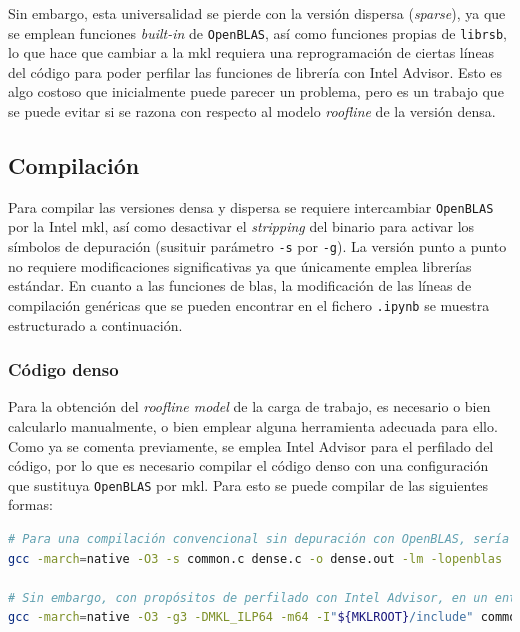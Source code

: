 Sin embargo, esta universalidad se pierde con la versión dispersa (\textit{sparse}), ya que se emplean funciones \textit{built-in} de \texttt{OpenBLAS}, así como funciones propias de \texttt{librsb}, lo que hace que cambiar a la \acrshort{mkl} requiera una reprogramación de ciertas líneas del código para poder perfilar las funciones de librería con Intel Advisor. Esto es algo costoso que inicialmente puede parecer un problema, pero es un trabajo que se puede evitar si se razona con respecto al modelo \textit{roofline} de la versión densa.

\subsection{Compilación}
\label{ssec:compilacion_metodologia}
Para compilar las versiones densa y dispersa se requiere intercambiar \texttt{OpenBLAS} por la Intel \acrshort{mkl}, así como desactivar el \textit{stripping} del binario para activar los símbolos de depuración (susituir parámetro \texttt{-s} por \texttt{-g}). La versión punto a punto no requiere modificaciones significativas ya que únicamente emplea librerías estándar. En cuanto a las funciones de \acrshort{blas}, la modificación de las líneas de compilación genéricas que se pueden encontrar en el fichero \texttt{.ipynb} se muestra estructurado a continuación.

\subsubsection{Código denso}
Para la obtención del \textit{roofline model} de la carga de trabajo, es necesario o bien calcularlo manualmente, o bien emplear alguna herramienta adecuada para ello. Como ya se comenta previamente, se emplea Intel Advisor para el perfilado del código, por lo que es necesario compilar el código denso con una configuración que sustituya \texttt{OpenBLAS} por \acrshort{mkl}. Para esto se puede compilar de las siguientes formas:\medskip
\begin{lstlisting}[language=bash]
# Para una compilación convencional sin depuración con OpenBLAS, sería necesario únicamente ejecutar
gcc -march=native -O3 -s common.c dense.c -o dense.out -lm -lopenblas

# Sin embargo, con propósitos de perfilado con Intel Advisor, en un entorno bash donde se haya realizado `source /opt/intel/oneapi/setvar.sh` se ha de compilar con:
gcc -march=native -O3 -g3 -DMKL_ILP64 -m64 -I"${MKLROOT}/include" common.c dense.c -o dense.out -L${MKLROOT}/lib/intel64 -Wl,--no-as-needed -lmkl_intel_ilp64 -lmkl_gnu_thread -lmkl_core -lgomp -lpthread -lm -ldl
\end{lstlisting}

